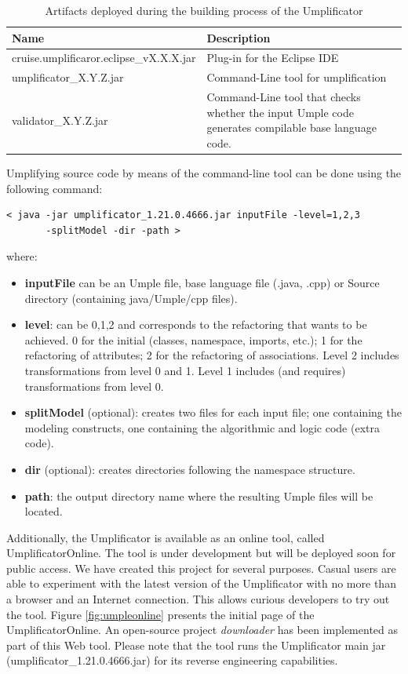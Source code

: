 \begin{table}[h]
\caption{Artifacts deployed during the building process of the Umplificator}
\label{table:jars}
\begin{tabularx}{\textwidth}{l|Y}
\toprule
{}
\textbf{Name} & \textbf{Description}  \\ \hline	
cruise.umplificaror.eclipse\_vX.X.X.jar &  Plug-in for the Eclipse IDE 
\\ \hline
umplificator\_X.Y.Z.jar & Command-Line tool for umplification 
\\ \hline
validator\_X.Y.Z.jar & Command-Line tool that checks whether the input Umple code generates compilable base language code. 
\\ \hline
\end{tabularx}
\end{table}

Umplifying source code by means of the command-line tool can be done using the following command:

\vspace{\baselineskip}
\begin{lstlisting}[style=umplePlain]
< java -jar umplificator_1.21.0.4666.jar inputFile -level=1,2,3 
       -splitModel -dir -path >
\end{lstlisting}

where:
\begin{itemize}
\item \textbf{inputFile} can be an Umple file, base language file (.java, .cpp) or Source directory (containing java/Umple/cpp files).
\item \textbf{level}: can be 0,1,2 and corresponds to the refactoring that wants to be achieved. 0 for the initial (classes, namespace, imports, etc.); 1 for the refactoring of attributes; 2 for the refactoring of associations. Level 2 includes transformations from level 0 and 1. Level 1 includes (and requires) transformations from level 0.
\item \textbf{splitModel} (optional): creates two files for each input file; one containing the modeling constructs, one containing the algorithmic and logic code (extra code). 
\item \textbf{dir} (optional): creates directories following the namespace structure.
\item \textbf{path}: the output directory name where the resulting Umple files will be located.
\end{itemize}

Additionally, the Umplificator is available as an online tool, called UmplificatorOnline. The tool is under development but will be deployed soon for public access. We have created this project for several purposes. Casual users are able to experiment with the latest version of the Umplificator with no more than a browser and an Internet connection. This allows curious developers to try out the tool. Figure \ref{fig:umpleonline} presents the initial page of the UmplificatorOnline.
An open-source project \textit{downloader} has been implemented as part of this Web tool. Please note that the tool runs the  Umplificator main jar (umplificator\_1.21.0.4666.jar) for its reverse engineering capabilities. 

